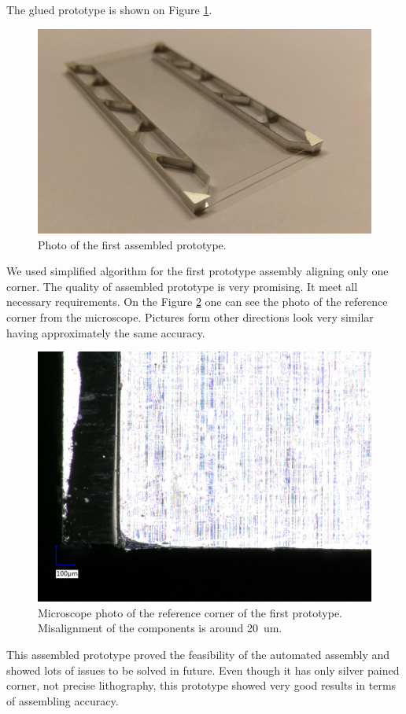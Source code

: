 The glued prototype is shown on Figure \ref{fig:module_prototype}.

\begin{figure}[ht]\centering
\includegraphics[width=1\linewidth]{Data/Precision_tests/Prototype_photo.png}
\caption{Photo of the first assembled prototype.}
\label{fig:module_prototype}
\end{figure}

We used simplified algorithm for the first prototype assembly aligning only one corner. The quality of assembled prototype is very promising. It meet all necessary requirements. On the Figure \ref{fig:prototype_macro} one can see the photo of the reference corner from the microscope. Pictures form other directions look very similar having approximately the same accuracy.

\begin{figure}[ht]\centering
\includegraphics[width=1\linewidth]{Data/Precision_tests/Top_sensor_X_view.png}
\caption{Microscope photo of the reference corner of the first prototype. Misalignment of the components is around 20~um.}
\label{fig:prototype_macro}
\end{figure}

This assembled prototype proved the feasibility of the automated assembly and showed lots of issues to be solved in future. Even though it has only silver pained corner, not precise lithography, this prototype showed very good results in terms of assembling accuracy.
